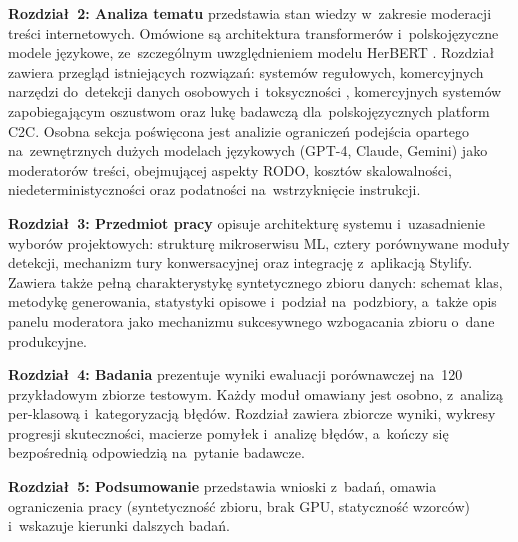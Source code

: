 \textbf{Rozdział~2: Analiza tematu} przedstawia stan wiedzy w~zakresie
moderacji treści internetowych. Omówione są architektura transformerów
i~polskojęzyczne modele językowe,
ze~szczególnym uwzględnieniem modelu HerBERT \cite{bib:herbert}. Rozdział zawiera
przegląd istniejących rozwiązań: systemów regułowych, komercyjnych
narzędzi do~detekcji danych osobowych i~toksyczności \cite{bib:perspective},
komercyjnych systemów zapobiegającym oszustwom oraz lukę badawczą dla~polskojęzycznych
platform C2C. Osobna sekcja poświęcona jest analizie ograniczeń podejścia
opartego na~zewnętrznych dużych modelach językowych (GPT-4, Claude, Gemini)
jako moderatorów treści, obejmującej aspekty RODO, kosztów skalowalności,
niedeterministyczności oraz podatności na~wstrzyknięcie instrukcji.

\textbf{Rozdział~3: Przedmiot pracy} opisuje architekturę systemu
i~uzasadnienie wyborów projektowych: strukturę mikroserwisu ML,
cztery porównywane moduły detekcji, mechanizm tury konwersacyjnej
oraz integrację z~aplikacją Stylify. Zawiera także pełną charakterystykę
syntetycznego zbioru danych: schemat klas, metodykę generowania, statystyki
opisowe i~podział na~podzbiory, a~także opis panelu moderatora jako mechanizmu
sukcesywnego wzbogacania zbioru o~dane produkcyjne.

\textbf{Rozdział~4: Badania} prezentuje wyniki ewaluacji porównawczej
na~120 przykładowym zbiorze testowym. Każdy moduł omawiany jest osobno,
z~analizą per-klasową i~kategoryzacją błędów. Rozdział zawiera zbiorcze wyniki, wykresy progresji skuteczności, macierze pomyłek i~analizę błędów,
a~kończy się bezpośrednią odpowiedzią na~pytanie badawcze.

\textbf{Rozdział~5: Podsumowanie} przedstawia wnioski z~badań, omawia
ograniczenia pracy (syntetyczność zbioru, brak GPU, statyczność wzorców)
i~wskazuje kierunki dalszych badań.

